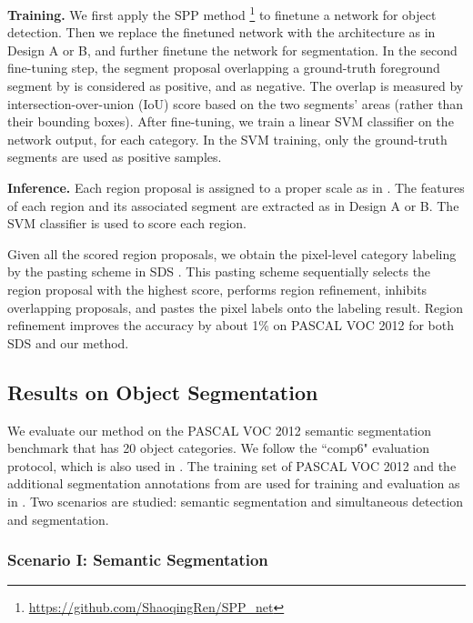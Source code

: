 \documentclass[10pt,twocolumn,letterpaper]{article}
\begin{document}
\vspace{6pt}
\noindent \textbf{Training.} We first apply the SPP method \cite{he2014spatial}\footnote{\url{https://github.com/ShaoqingRen/SPP_net}} to finetune a network for object detection. Then we replace the finetuned network with the architecture as in Design A or B, and further finetune the network for segmentation. In the second fine-tuning step, the segment proposal overlapping a ground-truth foreground segment by  is considered as positive, and  as negative. The overlap is measured by intersection-over-union (IoU) score based on the two segments' areas (rather than their bounding boxes).
After fine-tuning, we train a linear SVM classifier on the network output, for each category. In the SVM training, only the ground-truth segments are used as positive samples.

\vspace{6pt}
\noindent \textbf{Inference.}  Each region proposal is assigned to a proper scale as in \cite{he2014spatial}. The features of each region and its associated segment are extracted as in Design A or B. The SVM classifier is used to score each region.

Given all the scored region proposals, we obtain the pixel-level category labeling by the pasting scheme in SDS \cite{hariharan2014simultaneous}. This pasting scheme sequentially selects the region proposal with the highest score, performs region refinement, inhibits overlapping proposals, and pastes the pixel labels onto the labeling result. Region refinement improves the accuracy by about 1\% on PASCAL VOC 2012 for both SDS and our method.

\subsection{Results on Object Segmentation}
\label{sec:exp1}

We evaluate our method on the PASCAL VOC 2012 semantic segmentation benchmark \cite{everingham2010pascal} that has 20 object categories. We follow the ``comp6" evaluation protocol, which is also used in \cite{carreira2012semantic,girshick2013rich,hariharan2014simultaneous}. The training set of PASCAL VOC 2012 and the additional segmentation annotations from \cite{hariharan2011semantic} are used for training and evaluation as in \cite{carreira2012semantic,girshick2013rich,hariharan2014simultaneous}. Two scenarios are studied: semantic segmentation and simultaneous detection and segmentation.

\subsubsection*{Scenario I: Semantic Segmentation}
\end{document}
